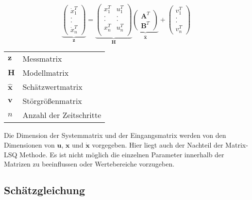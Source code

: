 \begin{equation}
    \underbrace{\begin{pmatrix}
        \dot{x}_1^T \\
        . \\
        . \\
        \dot{x}_n^T 
    \end{pmatrix}}_{\textbf{z}} =
    \underbrace{\begin{pmatrix}
        x_{1}^T& u_{1}^T \\
        . & .  \\
        . & .  \\
        x_{n}^T & u_{n}^T \\
    \end{pmatrix}}_{\textbf{H}}
    \underbrace{\begin{pmatrix}
        \textbf{A}^T \\
        \textbf{B}^T
    \end{pmatrix}}_{\hat{\textbf{x}}} +
    \begin{pmatrix}
        v_1^T \\
        . \\
        . \\
        v_n^T
    \end{pmatrix}
\end{equation}\label{eq:matrixLSQ}

\begin{tabular}[\textwidth]{l l}

$\textbf{z}$ & Messmatrix \\
$\textbf{H}$ & Modellmatrix \\
$\hat{\textbf{x}}$ & Schätzwertmatrix \\
$\textbf{v}$ & Störgrößenmatrix \\
$n$ & Anzahl der Zeitschritte \\
\end{tabular}

Die Dimension der Systemmatrix und der Eingangsmatrix werden von den Dimensionen von $\textbf{u}$,  $\textbf{x}$ und $\dot{\textbf{x}}$ vorgegeben. Hier liegt auch der Nachteil der Matrix-LSQ Methode. Es ist nicht möglich die einzelnen Parameter innerhalb der Matrizen zu beeinflussen oder Wertebereiche vorzugeben.


\subsection{Schätzgleichung}

